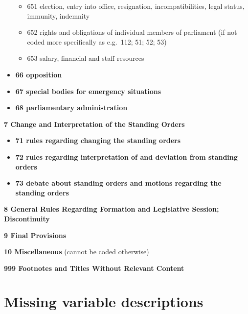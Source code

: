 \documentclass[]{article}
\newenvironment{Shaded}{\begin{snugshade}}{\end{snugshade}}
\newcommand{\KeywordTok}[1]{\textcolor[rgb]{0.13,0.29,0.53}{\textbf{{#1}}}}
\newcommand{\StringTok}[1]{\textcolor[rgb]{0.31,0.60,0.02}{{#1}}}
\newcommand{\NormalTok}[1]{{#1}}
\providecommand{\tightlist}{%
  \setlength{\itemsep}{0pt}\setlength{\parskip}{0pt}}
\begin{document}
\begin{itemize}
  \begin{itemize}
  \tightlist
  \item
    651 election, entry into office, resignation, incompatibilities,
    legal status, immunity, indemnity
  \item
    652 rights and obligations of individual members of parliament (if
    not coded more specifically as e.g.~112; 51; 52; 53)
  \item
    653 salary, financial and staff resources
  \end{itemize}
\item
  \textbf{66 opposition}
\item
  \textbf{67 special bodies for emergency situations}
\item
  \textbf{68 parliamentary administration}
\end{itemize}

\textbf{7 Change and Interpretation of the Standing Orders}

\begin{itemize}
\tightlist
\item
  \textbf{71 rules regarding changing the standing orders}
\item
  \textbf{72 rules regarding interpretation of and deviation from
  standing orders}
\item
  \textbf{73 debate about standing orders and motions regarding the
  standing orders}
\end{itemize}

\textbf{8 General Rules Regarding Formation and Legislative Session;
Discontinuity}

\textbf{9 Final Provisions}

\textbf{10 Miscellaneous} (cannot be coded otherwise)

\textbf{999 Footnotes and Titles Without Relevant Content}

\section{Missing variable
descriptions}\label{missing-variable-descriptions}

\begin{Shaded}
\end{Shaded}
\end{document}
